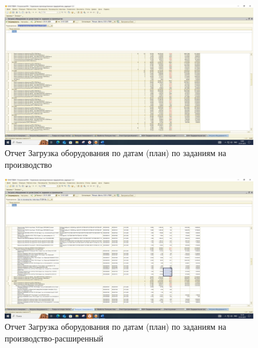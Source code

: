 \begin{figure}
\begin{center}
 \includegraphics[height=0.35\textheight, keepaspectratio]{Pics/ПЛ1.jpg}
\end{center}
 \caption{Отчет Загрузка оборудования по датам (план) по заданиям на производство}
 \label{pic:ПЛ1}
\end{figure}


\begin{figure}
\begin{center}
 \includegraphics[height=0.45\textheight, angle=90, keepaspectratio]{Pics/ПЛ2.jpg}
\end{center}
 \caption{Отчет Загрузка оборудования по датам (план) по заданиям на производство-расширенный}
 \label{pic:ПЛ2}
\end{figure}


